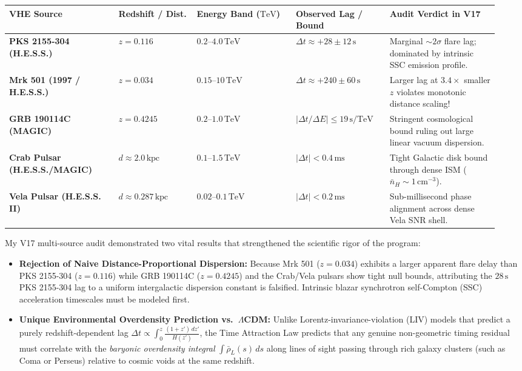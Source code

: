 \begin{center}\vspace{-2pt}
{\footnotesize
\begin{tabular}{@{}>{\bfseries}p{0.21\linewidth}p{0.15\linewidth}p{0.19\linewidth}p{0.18\linewidth}p{0.21\linewidth}@{}}
\toprule
VHE Source & Redshift / Dist. & Energy Band ($\text{TeV}$) & Observed Lag / Bound & Audit Verdict in V17 \\
\midrule
PKS 2155-304 (H.E.S.S.) & $z = 0.116$ & $0.2\text{--}4.0\,\text{TeV}$ & $\Delta t \approx +28 \pm 12\,\text{s}$ & Marginal $\sim 2\sigma$ flare lag; dominated by intrinsic SSC emission profile. \\
Mrk 501 (1997 / H.E.S.S.) & $z = 0.034$ & $0.15\text{--}10\,\text{TeV}$ & $\Delta t \approx +240 \pm 60\,\text{s}$ & Larger lag at $3.4\times$ smaller $z$ violates monotonic distance scaling! \\
GRB 190114C (MAGIC) & $z = 0.4245$ & $0.2\text{--}1.0\,\text{TeV}$ & $|\Delta t / \Delta E| \le 19\,\text{s/TeV}$ & Stringent cosmological bound ruling out large linear vacuum dispersion. \\
Crab Pulsar (H.E.S.S./MAGIC) & $d \approx 2.0\,\text{kpc}$ & $0.1\text{--}1.5\,\text{TeV}$ & $|\Delta t| < 0.4\,\text{ms}$ & Tight Galactic disk bound through dense ISM ($\bar{n}_H \sim 1\,\text{cm}^{-3}$). \\
Vela Pulsar (H.E.S.S. II) & $d \approx 0.287\,\text{kpc}$ & $0.02\text{--}0.1\,\text{TeV}$ & $|\Delta t| < 0.2\,\text{ms}$ & Sub-millisecond phase alignment across dense Vela SNR shell. \\
\bottomrule
\end{tabular}}
\end{center}

\par
My V17 multi-source audit demonstrated two vital results that strengthened the scientific rigor of the program:
\begin{itemize}\setlength{\itemsep}{1.5pt}\setlength{\parskip}{0pt}\setlength{\topsep}{1pt}
  \item \textbf{Rejection of Naive Distance-Proportional Dispersion:} Because Mrk 501 ($z=0.034$) exhibits a larger apparent flare delay than PKS 2155-304 ($z=0.116$) while GRB 190114C ($z=0.4245$) and the Crab/Vela pulsars show tight null bounds, attributing the $28\,\text{s}$ PKS 2155-304 lag to a uniform intergalactic dispersion constant is falsified. Intrinsic blazar synchrotron self-Compton (SSC) acceleration timescales must be modeled first.
  \item \textbf{Unique Environmental Overdensity Prediction vs.\ $\Lambda$CDM:} Unlike Lorentz-invariance-violation (LIV) models that predict a purely redshift-dependent lag $\Delta t \propto \int_0^z \frac{(1+z')\,dz'}{H(z')}$, the Time Attraction Law predicts that any genuine non-geometric timing residual must correlate with the \emph{baryonic overdensity integral} $\int \bar{\rho}_L(s)\,ds$ along lines of sight passing through rich galaxy clusters (such as Coma or Perseus) relative to cosmic voids at the same redshift.
\end{itemize}
\newpage

